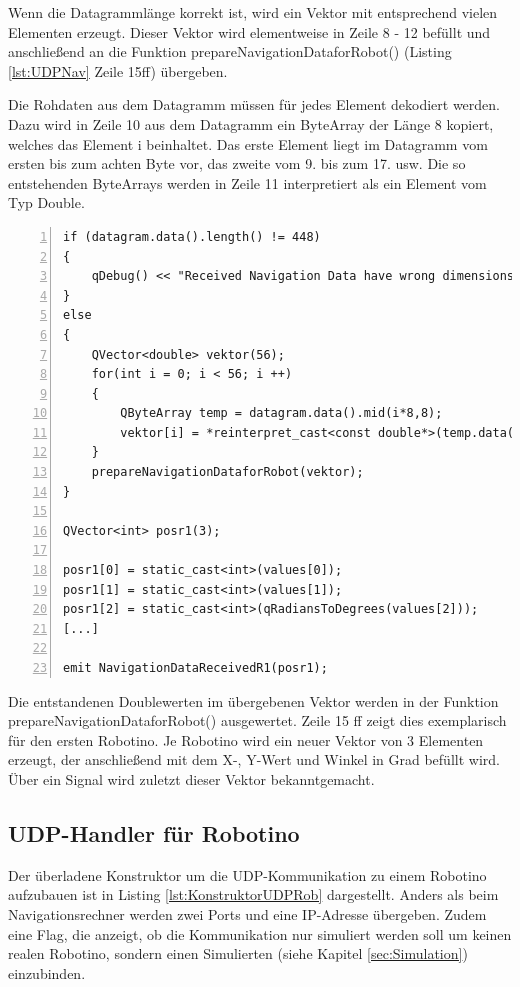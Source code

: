Wenn die Datagrammlänge korrekt ist, wird ein Vektor mit entsprechend vielen Elementen erzeugt. Dieser Vektor wird elementweise in Zeile 8 - 12 befüllt und anschließend an die Funktion prepareNavigationDataforRobot() (Listing \ref{lst:UDPNav} Zeile 15ff) übergeben. 

Die Rohdaten aus dem Datagramm müssen für jedes Element dekodiert werden. Dazu wird in Zeile 10 aus dem Datagramm ein ByteArray der Länge 8 kopiert, welches das Element i beinhaltet. Das erste Element liegt im Datagramm vom ersten bis zum achten Byte vor, das zweite vom 9. bis zum 17. usw. Die so entstehenden ByteArrays werden in Zeile 11 interpretiert als ein Element vom Typ Double. 

\begin{lstlisting}[frame=single, breaklines=true, numbers=left, stepnumber=2, firstnumber=1, numberstyle = \tiny, caption=UDP-Handler Navigationsdatenaustausch,label=lst:UDPNav]
if (datagram.data().length() != 448)
{
    qDebug() << "Received Navigation Data have wrong dimensions: " << datagram.data().length();
}
else
{
    QVector<double> vektor(56);
    for(int i = 0; i < 56; i ++)
    {
        QByteArray temp = datagram.data().mid(i*8,8);
        vektor[i] = *reinterpret_cast<const double*>(temp.data());
    }
    prepareNavigationDataforRobot(vektor);
}

QVector<int> posr1(3);

posr1[0] = static_cast<int>(values[0]);
posr1[1] = static_cast<int>(values[1]);
posr1[2] = static_cast<int>(qRadiansToDegrees(values[2]));
[...]

emit NavigationDataReceivedR1(posr1);

\end{lstlisting}

Die entstandenen Doublewerten im übergebenen Vektor werden in der Funktion prepareNavigationDataforRobot() ausgewertet. Zeile 15 ff zeigt dies exemplarisch für den ersten Robotino. Je Robotino wird ein neuer Vektor von 3 Elementen erzeugt, der anschließend mit dem X-, Y-Wert und Winkel in Grad befüllt wird. Über ein Signal wird zuletzt dieser Vektor bekanntgemacht. 

\subsection{UDP-Handler für Robotino}

Der überladene Konstruktor um die UDP-Kommunikation zu einem Robotino aufzubauen ist in Listing \ref{lst:KonstruktorUDPRob} dargestellt. Anders als beim Navigationsrechner werden zwei Ports und eine IP-Adresse übergeben. Zudem eine Flag, die anzeigt, ob die Kommunikation nur simuliert werden soll um keinen realen Robotino, sondern einen Simulierten (siehe Kapitel \ref{sec:Simulation}) einzubinden. 

